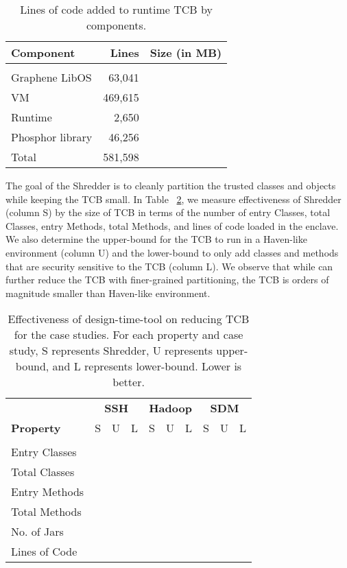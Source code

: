 \begin{table}[t!b!]
	\footnotesize
	\centering
	\begin{tabular}{lrr}
		\hline
		{\bf Component} & {\bf Lines} & {\bf Size (in MB)}\\
		\hline\\
		Graphene LibOS & 63,041 &  \\
		\java{} VM & 469,615 &  \\
		\sysname{} Runtime & 2,650 &  \\
		Phosphor library & 46,256 &  \\
		\hline
		Total & 581,598 &  \\
		\hline
	\end{tabular}
	\caption{Lines of code added to runtime TCB by \sysname{} components.}
	\label{tab:common-tcb}
\end{table}

The goal of the \sysname{} Shredder is to cleanly partition the trusted classes and objects while keeping the TCB small. 
In Table ~\ref{tab:case-tcb}, we measure effectiveness of Shredder (column S) by the size of TCB in terms of the number of entry Classes, total Classes, entry Methods, total Methods, and lines of code loaded in the enclave. 
We also determine the upper-bound for the TCB to run in a Haven-like environment (column U) and the lower-bound to only add classes and methods that are security sensitive to the TCB (column L). We observe that while \sysname{} can further reduce the TCB with finer-grained partitioning, the TCB is orders of magnitude smaller than Haven-like environment.

\begin{table}[t!b!]
	\footnotesize
	\centering
	\tabcolsep=0.09cm
	\begin{tabular}{lrrrrrrrrr}
		\hline
		& \multicolumn{3}{c}{{\bf SSH}} & \multicolumn{3}{c}{{\bf Hadoop}} & \multicolumn{3}{c}{{\bf SDM}}\\
		
		{\bf Property} & {S} & {U} & {L} 
		& {S} & {U} & {L} 
		& {S} & {U} & {L}\\
		\hline\\
		Entry Classes &  &  &  &  &  &  &  &  &  \\
		Total Classes &  &  &  &  &  &  &  &  &  \\
		Entry Methods &  &  &  &  &  &  &  &  &  \\
		Total Methods &  &  &  &  &  &  &  &  &  \\
		No. of Jars &  &  &  &  &  &  &  &  &  \\
		Lines of Code &  &  &  &  &  &  &  &  &  \\
		\hline
	\end{tabular}
	\caption{Effectiveness of \sysname{} design-time-tool on reducing TCB for the case studies. For each property and case study, S represents Shredder, U represents upper-bound, and L represents lower-bound. Lower is better.}
	\label{tab:case-tcb}
\end{table}
